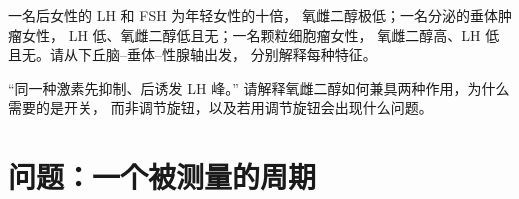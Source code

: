\begin{exercise}[$\star\star\star$]\label{exo:b2:reproductive-hormones:11}
一名后女性的 LH 和 FSH 为年轻女性的十倍，
氧雌二醇极低；一名分泌的垂体肿瘤女性，
LH 低、氧雌二醇低且无；一名颗粒细胞瘤女性，
氧雌二醇高、LH 低且无。请从下丘脑–垂体–性腺轴出发，
分别解释每种特征。
\end{exercise}

\begin{exercise}[$\star\star\star$]\label{exo:b2:reproductive-hormones:12}
“同一种激素先抑制、后诱发 LH 峰。”
请解释氧雌二醇如何兼具两种作用，为什么需要的是开关，
而非调节旋钮，以及若用调节旋钮会出现什么问题。
\end{exercise}

\section{问题：一个被测量的周期}

